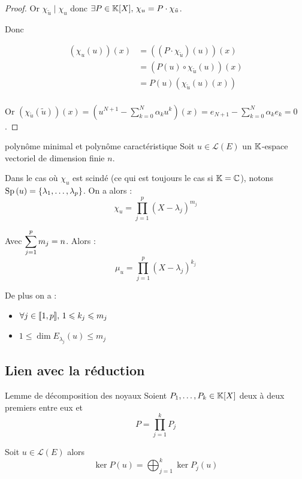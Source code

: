\begin{proof}
    Or $\chi_{\tilde u} \mid \chi_u$ donc $\exists P \in \mathbb{K}[X], \, \chi_u = P \cdot \chi_{\tilde u}$.

    Donc 

    \begin{align}
        (\chi_u(u))(x) & = ((P \cdot \chi_{\tilde u})(u))(x) \\
        & = (P(u) \circ \chi_{\tilde u}(u))(x) \\
        & = P(u)(\chi_{\tilde u}(u)(x)) \\
    \end{align}

    Or $\displaystyle (\chi_{\tilde u}(\tilde u))(x) = (u^{N + 1} - \sum_{k = 0 }^{ N } \alpha_k u^k)(x) = e_{N + 1} - \sum_{k = 0 }^{ N } \alpha_k e_k = 0$.
\end{proof}

\begin{corollaire}{polynôme minimal et polynôme caractéristique}{}
    Soit $u \in \mathscr L(E)$ un $\mathbb{K}$-espace vectoriel de dimension finie $n$.

    Dans le cas où $\chi_u$ est scindé (ce qui est toujours le cas si $\mathbb{K} = \mathbb{C}$), 
    notons $\operatorname{Sp} \,(u) = \{\lambda_1, \ldots, \lambda_p\}$. On a alors : 
    $$\chi_u = \displaystyle \prod_{j = 1 }^{ p } (X - \lambda_j)^{m_j}$$

    Avec $\displaystyle \sum_{j = 1 }^{p } m_j = n$.
    Alors : 
    $$\mu_u = \displaystyle \prod_{j = 1 }^{ p } (X - \lambda_j)^{k_j}$$

    De plus on a : 
    \begin{itemize}
        \item $\forall j \in [\![1, p]\!], \, 1 \leqslant k_j \leqslant m_j$
        \item $1 \leqslant \dim E_{\lambda_j}(u) \leqslant m_j$ 
    \end{itemize}
\end{corollaire}

\subsection{Lien avec la réduction}

\begin{theoreme}{Lemme de décomposition des noyaux}{}
    Soient $P_1, \dots, P_k \in \mathbb{K}[X]$ deux à deux premiers entre eux et 
    $$P = \displaystyle \prod_{j = 1 }^{ k } P_j$$   
    
    Soit $u \in \mathscr L(E)$ alors 
    $$\displaystyle \ker P(u) = \bigoplus_{j = 1 }^{ k } \ker P_j(u)$$
\end{theoreme}

